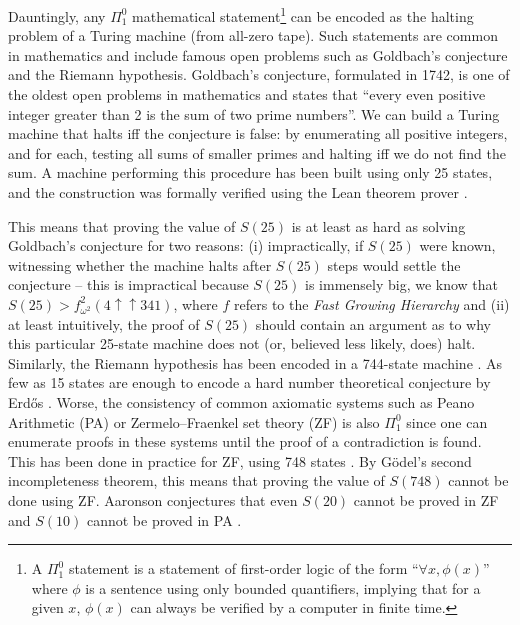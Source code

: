 \documentclass[a4paper,british]{article}
\theoremstyle{definition} %
\numberwithin{equation}{section}
\theoremstyle{definition} %
\begin{document}
Dauntingly, any $\Pi_1^0$ mathematical statement\footnote{A $\Pi_1^0$ statement is a statement of first-order logic of the form ``$\forall x, \phi(x)$'' where $\phi$ is a sentence using only bounded quantifiers, implying that for a given $x$, $\phi(x)$ can always be verified by a computer in finite time.} can be encoded as the halting problem of a Turing machine (from all-zero tape). Such statements are common in mathematics and include famous open problems such as Goldbach's conjecture and the Riemann hypothesis. Goldbach's conjecture, formulated in 1742, is one of the oldest open problems in mathematics and states that ``every even positive integer greater than 2 is the sum of two prime numbers''. We can build a Turing machine that halts iff the conjecture is false: by enumerating all positive integers, and for each, testing all sums of smaller primes and halting iff we do not find the sum. A machine performing this procedure has been built using only 25 states, and the construction was formally verified using the Lean theorem prover \cite{GoldbachTM27, GoldbachTM25, DeMouraKongAvigadVanDoornvonRaumer}.

This means that proving the value of $S(25)$ is at least as hard as solving Goldbach's conjecture for two reasons: (i) impractically, if $S(25)$ were known, witnessing whether the machine halts after $S(25)$ steps would settle the conjecture -- this is impractical because $S(25)$ is immensely big, we know that $S(25) > f^2_{\omega^2}(4 \uparrow \uparrow 341)$, where $f$ refers to the \textit{Fast Growing Hierarchy} \cite{wikiChampions,wainer1970classification} and (ii) at least intuitively, the proof of $S(25)$ should contain an argument as to why this particular 25-state machine does not (or, believed less likely, does) halt. Similarly, the Riemann hypothesis has been encoded in a 744-state machine \cite{RiemannTM,Yedidia2016,BusyBeaverFrontier}. As few as 15 states are enough to encode a hard number theoretical conjecture by Erd\H{o}s \cite{BB15}. Worse, the consistency of common axiomatic systems such as Peano Arithmetic (PA) or Zermelo–Fraenkel set theory (ZF) is also $\Pi_1^0$ since one can enumerate proofs in these systems until the proof of a contradiction is found. This has been done in practice for ZF, using 748 states \cite{ZFTM,Yedidia2016,BusyBeaverFrontier,BB748Thesis}. By G\"odel's second incompleteness theorem, this means that proving the value of $S(748)$ cannot be done using ZF. Aaronson conjectures that even $S(20)$ cannot be proved in ZF and $S(10)$ cannot be proved in PA \cite{BusyBeaverFrontier}.
\end{document}
